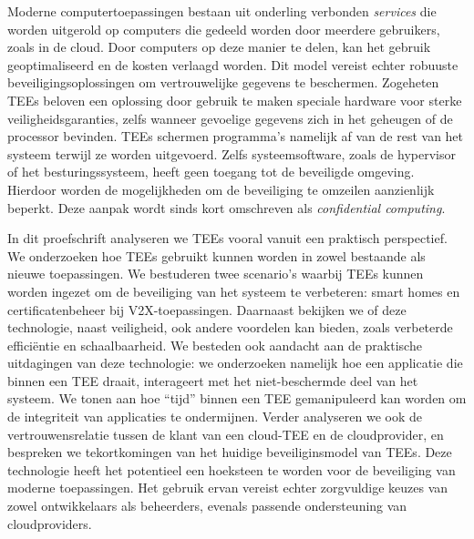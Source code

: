 Moderne computertoepassingen bestaan uit onderling verbonden \emph{services} die
worden uitgerold op computers die gedeeld worden door meerdere gebruikers, zoals
in de cloud. Door computers op deze manier te delen, kan het gebruik
geoptimaliseerd en de kosten verlaagd worden. Dit model vereist echter robuuste
beveiligingsoplossingen om vertrouwelijke gegevens te beschermen. Zogeheten
\acp{TEE} beloven een oplossing door gebruik te maken speciale hardware voor
sterke veiligheidsgaranties, zelfs wanneer gevoelige gegevens zich in het
geheugen of de processor bevinden. \acp{TEE} schermen programma's namelijk af
van de rest van het systeem terwijl ze worden uitgevoerd. Zelfs systeemsoftware,
zoals de hypervisor of het besturingssysteem, heeft geen toegang tot de
beveiligde omgeving. Hierdoor worden de mogelijkheden om de beveiliging te
omzeilen aanzienlijk beperkt. Deze aanpak wordt sinds kort omschreven als
\emph{confidential computing}.

In dit proefschrift analyseren we \acp{TEE} vooral vanuit een praktisch
perspectief. We onderzoeken hoe \acp{TEE} gebruikt kunnen worden in zowel
bestaande als nieuwe toepassingen. We bestuderen twee scenario's waarbij
\acp{TEE} kunnen worden ingezet om de beveiliging van het systeem te verbeteren:
smart homes en certificatenbeheer bij \ac{V2X}-toepassingen. Daarnaast bekijken
we of deze technologie, naast veiligheid, ook andere voordelen kan bieden, zoals
verbeterde efficiëntie en schaalbaarheid. We besteden ook aandacht aan de
praktische uitdagingen van deze technologie: we onderzoeken namelijk hoe een
applicatie die binnen een \ac{TEE} draait, interageert met het niet-beschermde
deel van het systeem. We tonen aan hoe ``tijd'' binnen een \ac{TEE}
gemanipuleerd kan worden om de integriteit van applicaties te ondermijnen.
Verder analyseren we ook de vertrouwensrelatie tussen de klant van een
cloud-\ac{TEE} en de cloudprovider, en bespreken we tekortkomingen van het
huidige beveiliginsmodel van \acp{TEE}. Deze technologie heeft het potentieel
een hoeksteen te worden voor de beveiliging van moderne toepassingen. Het
gebruik ervan vereist echter zorgvuldige keuzes van zowel ontwikkelaars als
beheerders, evenals passende ondersteuning van cloudproviders.
